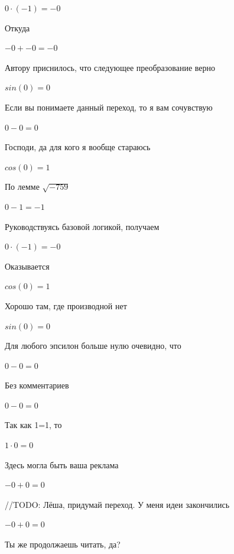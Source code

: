 \documentclass[12pt,a4paper,fleqn]{article}
\begin{document}
\begin{center}$0 \cdot (-1) = -0$\end{center}
Откуда

\begin{center}$-0+-0 = -0$\end{center}
Автору приснилось, что следующее преобразование верно

\begin{center}$sin(0) = 0$\end{center}
Если вы понимаете данный переход, то я вам сочувствую

\begin{center}$0-0 = 0$\end{center}
Господи, да для кого я вообще стараюсь

\begin{center}$cos(0) = 1$\end{center}
По лемме $\sqrt{-759}$
\begin{center}$0-1 = -1$\end{center}
Руководствуясь базовой логикой, получаем

\begin{center}$0 \cdot (-1) = -0$\end{center}
Оказывается

\begin{center}$cos(0) = 1$\end{center}
Хорошо там, где производной нет\cite{link2}

\begin{center}$sin(0) = 0$\end{center}
Для любого эпсилон больше нулю очевидно, что

\begin{center}$0-0 = 0$\end{center}
Без комментариев\cite{link4}

\begin{center}$0-0 = 0$\end{center}
Так как 1=1, то\cite{link4}

\begin{center}$1 \cdot 0 = 0$\end{center}
Здесь могла быть ваша реклама

\begin{center}$-0+0 = 0$\end{center}
//TODO: Лёша, придумай переход. У меня идеи закончились

\begin{center}$-0+0 = 0$\end{center}
Ты же продолжаешь читать, да?
\end{document}
